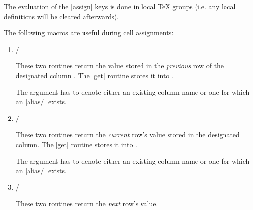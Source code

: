 \begin{command}{\pgfplotstablecreatecol{}}
    The evaluation of the |assign| keys is done in local \TeX{} groups (i.e.\@
    any local definitions will be cleared afterwards).

    The following macros are useful during cell assignments:
    \begin{enumerate}
        \item \declareandlabel{\prevrow} /
            \declareandlabel{\getprevrow}

            These two routines return the value stored in the \emph{previous}
            row of the designated column . The |get| routine
            stores it into .

            The argument  has to denote either an existing
            column name or one for which an |alias/| exists.
        \item \declareandlabel{\thisrow} /
            \declareandlabel{\getthisrow}

            These two routines return the \emph{current} row's value stored
            in the designated column. The |get| routine stores it into
            .

            The argument  has to denote either an existing
            column name or one for which an |alias/| exists.
        \item \declareandlabel{\nextrow} /
            \declareandlabel{\getnextrow}

            These two routines return the \emph{next} row's value.


\end{enumerate}
\end{command}
